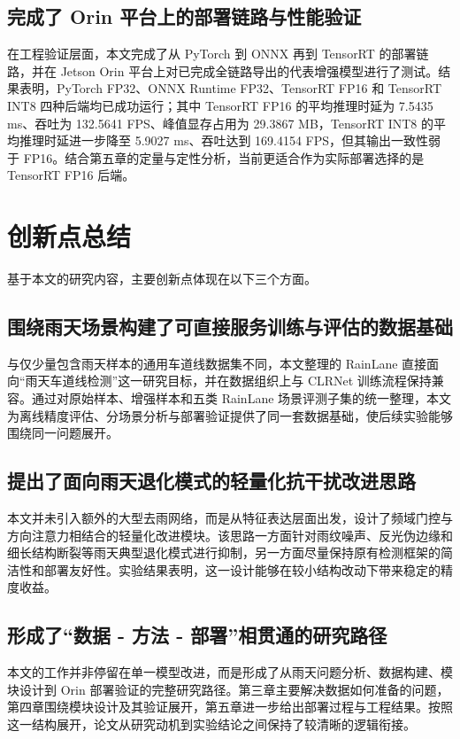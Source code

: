 \subsection{完成了 Orin 平台上的部署链路与性能验证}

在工程验证层面，本文完成了从 PyTorch 到 ONNX 再到 TensorRT 的部署链路，并在 Jetson Orin 平台上对已完成全链路导出的代表增强模型进行了测试。结果表明，PyTorch FP32、ONNX Runtime FP32、TensorRT FP16 和 TensorRT INT8 四种后端均已成功运行；其中 TensorRT FP16 的平均推理时延为 7.5435 ms、吞吐为 132.5641 FPS、峰值显存占用为 29.3867 MB，TensorRT INT8 的平均推理时延进一步降至 5.9027 ms、吞吐达到 169.4154 FPS，但其输出一致性弱于 FP16。结合第五章的定量与定性分析，当前更适合作为实际部署选择的是 TensorRT FP16 后端。

\section{创新点总结}
\label{sec:innovation}

基于本文的研究内容，主要创新点体现在以下三个方面。

\subsection{围绕雨天场景构建了可直接服务训练与评估的数据基础}

与仅少量包含雨天样本的通用车道线数据集不同，本文整理的 RainLane 直接面向“雨天车道线检测”这一研究目标，并在数据组织上与 CLRNet 训练流程保持兼容。通过对原始样本、增强样本和五类 RainLane 场景评测子集的统一整理，本文为离线精度评估、分场景分析与部署验证提供了同一套数据基础，使后续实验能够围绕同一问题展开。

\subsection{提出了面向雨天退化模式的轻量化抗干扰改进思路}

本文并未引入额外的大型去雨网络，而是从特征表达层面出发，设计了频域门控与方向注意力相结合的轻量化改进模块。该思路一方面针对雨纹噪声、反光伪边缘和细长结构断裂等雨天典型退化模式进行抑制，另一方面尽量保持原有检测框架的简洁性和部署友好性。实验结果表明，这一设计能够在较小结构改动下带来稳定的精度收益。

\subsection{形成了“数据 - 方法 - 部署”相贯通的研究路径}

本文的工作并非停留在单一模型改进，而是形成了从雨天问题分析、数据构建、模块设计到 Orin 部署验证的完整研究路径。第三章主要解决数据如何准备的问题，第四章围绕模块设计及其验证展开，第五章进一步给出部署过程与工程结果。按照这一结构展开，论文从研究动机到实验结论之间保持了较清晰的逻辑衔接。

